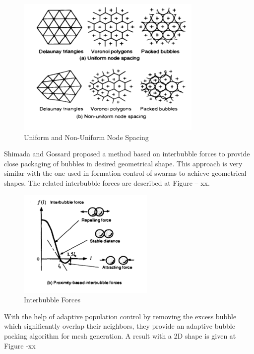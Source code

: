 \begin{figure}[H]
	\caption{Uniform and Non-Uniform Node Spacing}
	\centering
	\includegraphics[scale = 1]{nodespacing}
\end{figure}

Shimada and Gossard proposed a method based on interbubble forces to provide close packaging of bubbles in desired geometrical shape. This approach is very similar with the one used in formation control of swarms to achieve geometrical shapes. The related interbubble forces are described at Figure – xx.

\begin{figure}[H]
	\caption{Interbubble Forces}
	\centering
	\includegraphics[scale = 1]{interbubble}
\end{figure}


With the help of adaptive population control by removing the excess bubble which significantly overlap their neighbors, they provide an adaptive bubble packing algorithm for mesh generation. A result with a 2D shape is given at Figure -xx


